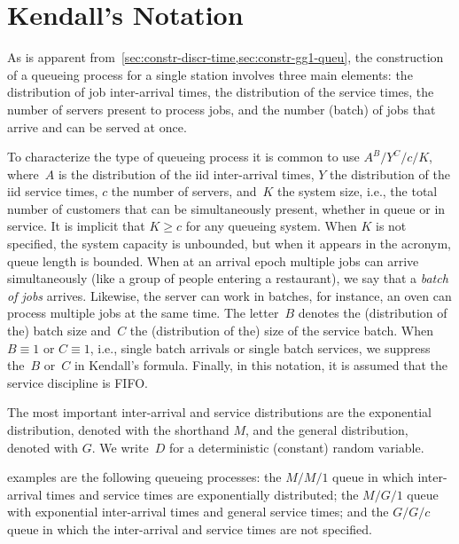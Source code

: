 \documentclass[stochastic-or.tex]{subfiles}
\begin{document}
\section{Kendall's Notation}
\label{sec:kendalls-notation}

As is apparent from~\cref{sec:constr-discr-time,sec:constr-gg1-queu}, the construction of a queueing process for a single station involves three main elements: the distribution of job inter-arrival times, the distribution of the service times, the number of servers present to process jobs, and the number (batch) of jobs that arrive and can be served at once.


To characterize the type of queueing process it is common to use  $A^{B}/Y^{C}/c/K$, where~$A$ is the distribution of the iid inter-arrival times,
$Y$ the distribution of the iid service times, $c$ the number of servers, and~$K$ the system size, i.e., the total number of customers that can be simultaneously present, whether in queue or in service. It is implicit that $K\geq c$ for any queueing system. When $K$ is not specified, the system capacity is unbounded, but when it appears in the acronym,  queue length is bounded.
When at an arrival epoch multiple jobs can arrive simultaneously (like a group of people entering a restaurant), we say that a \emph{batch of jobs} arrives.
Likewise, the server can work in batches, for instance, an oven can  process multiple jobs at the same time.
The letter~$B$ denotes  the (distribution of the) batch size and~$C$ the (distribution of the) size of the service batch.
When $B\equiv 1$ or $C \equiv 1$, i.e., single batch arrivals or single batch services, we suppress the~$B$ or~$C$ in Kendall's formula.
Finally, in this notation, it is assumed that the service discipline is FIFO.


The most important inter-arrival and service distributions are the exponential distribution, denoted with the shorthand  $M$, and the general distribution,  denoted with  $G$. We write~$D$ for a deterministic (constant) random variable.

 examples are the following queueing processes: the $M/M/1$ queue in which inter-arrival times and service times are exponentially distributed;  the $M/G/1$ queue with exponential inter-arrival times and general service times; and the $G/G/c$ queue in which the inter-arrival and service times are not specified.
\end{document}
